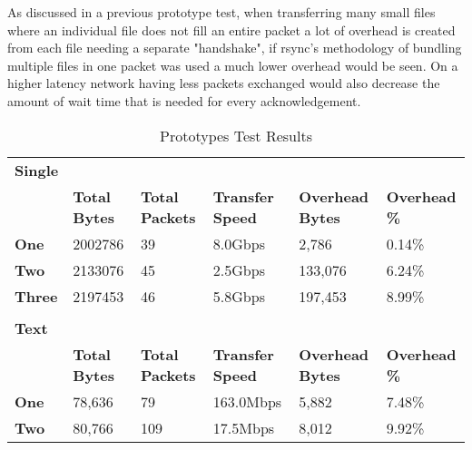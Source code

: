 As discussed in a previous prototype test, when transferring many small files where an individual file does not fill an entire packet a lot of overhead is created from each file needing a separate "handshake", if rsync's methodology of bundling multiple files in one packet was used a much lower overhead would be seen. On a higher latency network having less packets exchanged would also decrease the amount of wait time that is needed for every acknowledgement.


\begin{table}[h!]
	\caption{Prototypes Test Results}
	\label{tab:prototypes-test-results}
	\centering
	\begin{tabular}{l l l l l l}
		\textbf{Single}     &                      &                        &                         &                         &                      \\
		\textbf{}           & \textbf{Total Bytes} & \textbf{Total Packets} & \textbf{Transfer Speed} & \textbf{Overhead Bytes} & \textbf{Overhead \%} \\
		\hline
		\textbf{One}        & 2002786              & 39                     & 8.0Gbps                 & 2,786                   & 0.14\%               \\
		\hline
		\textbf{Two}        & 2133076              & 45                     & 2.5Gbps                 & 133,076                 & 6.24\%               \\
		\hline
		\textbf{Three}      & 2197453              & 46                     & 5.8Gbps                 & 197,453                 & 8.99\%               \\
		\hline
		                    &                      &                        &                         &                         &                      \\
		\textbf{Text}       &                      &                        &                         &                         &                      \\
		\textbf{}           & \textbf{Total Bytes} & \textbf{Total Packets} & \textbf{Transfer Speed} & \textbf{Overhead Bytes} & \textbf{Overhead \%} \\
		\hline
		\textbf{One}        & 78,636               & 79                     & 163.0Mbps               & 5,882                   & 7.48\%               \\
		\hline
		\textbf{Two}        & 80,766               & 109                    & 17.5Mbps                & 8,012                   & 9.92\%               \\

\end{tabular}
\end{table}
